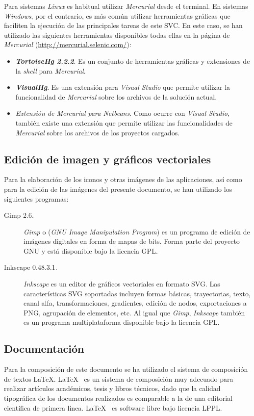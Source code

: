   Para sistemas \emph{Linux} es habitual utilizar \emph{Mercurial} desde el
  terminal. En sistemas \emph{Windows}, por el contrario, es más común utilizar
  herramientas gráficas que faciliten la ejecución de las principales tareas
  de este \acs{SVC}. En este caso, se han utilizado las siguientes herramientas
  disponibles todas ellas en la página de \emph{Mercurial}
  (\url{http://mercurial.selenic.com/}):
  \begin{itemize}
    \item \emph{\textbf{TortoiseHg 2.2.2}}. Es un conjunto de herramientas 
    gráficas y extensiones de la \emph{shell} para \emph{Mercurial}.
    \item \emph{\textbf{VisualHg}}. Es una extensión para \emph{Visual Studio}
    que permite utilizar la funcionalidad de \emph{Mercurial} sobre los
    archivos de la solución actual.
    \item \emph{Extensión de Mercurial para Netbeans}. Como ocurre con
    \emph{Visual Studio}, también existe una extensión que permite utilizar
    las funcionalidades de \emph{Mercurial} sobre los archivos de los 
    proyectos cargados.
  \end{itemize}

  \subsection{Edición de imagen y gráficos vectoriales}
  Para la elaboración de los iconos y otras imágenes de las aplicaciones, así
  como para la edición de las imágenes del presente documento, se han utilizado
  los siguientes programas:
  \begin{description}
  \item[Gimp 2.6.] \emph{Gimp} o (\emph{\acs{GNU} Image Manipulation Program})
  es un programa de edición de imágenes digitales en forma de mapas de bits.
  Forma parte del proyecto \acs{GNU} y está disponible bajo la licencia
  \acs{GPL}.
  \item[Inkscape 0.48.3.1.] \emph{Inkscape} es un editor de gráficos 
  vectoriales en formato \acs{SVG}. Las características \acs{SVG} soportadas
  incluyen formas básicas, trayectorias, texto, canal alfa, transformaciones,
  gradientes, edición de nodos, exportaciones a \acs{PNG}, agrupación de
  elementos, etc. Al igual que \emph{Gimp}, \emph{Inkscape} también es un
  programa multiplataforma disponible bajo la licencia \acs{GPL}.
  \end{description}

  \subsection{Documentación}
  Para la composición de este documento se ha utilizado el sistema de
  composición de textos \LaTeX. \LaTeX~ es un sistema de composición muy
  adecuado para realizar artículos académicos, tesis y libros técnicos, dado
  que la calidad tipográfica de los documentos realizados es comparable a la
  de una editorial científica de primera línea\cite{bib:LaTeX}. \LaTeX~ es
  software libre bajo licencia \acs{LPPL}.


